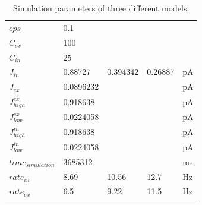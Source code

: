 \documentclass[11pt]{article}
\begin{document}
\begin{table}
\begin{tabular}{lllll}
$eps$                 &        0.1 &        &         &             \\
$C_{ex}$              &        100 &         &         &             \\
$C_{in}$              &         25 &          &          &             \\
$J_{in}$              &    0.88727 &   0.394342 &    0.26887 &          pA \\
$J_{ex}$              &  0.0896232 &   &   &          pA \\
$J_{high}^{ex}$       &   0.918638 &    &    &          pA \\
$J_{low}^{ex}$        &  0.0224058 &   &   &          pA \\
$J_{high}^{in}$       &   0.918638 &    &   &          pA \\
$J_{low}^{in}$        &  0.0224058 &   &   &          pA \\
$time_{simulation}$   &    3685312 &        &           &         ms \\
$rate_{in}$           &    8.69 &    10.56 &     12.7 &          Hz \\
$rate_{ex}$           &    6.5 &    9.22 &    11.5 &          Hz \\
\bottomrule
\end{tabular}
\caption{\label{tab:params} Simulation parameters of three different models.}
\end{table}
\end{document}
